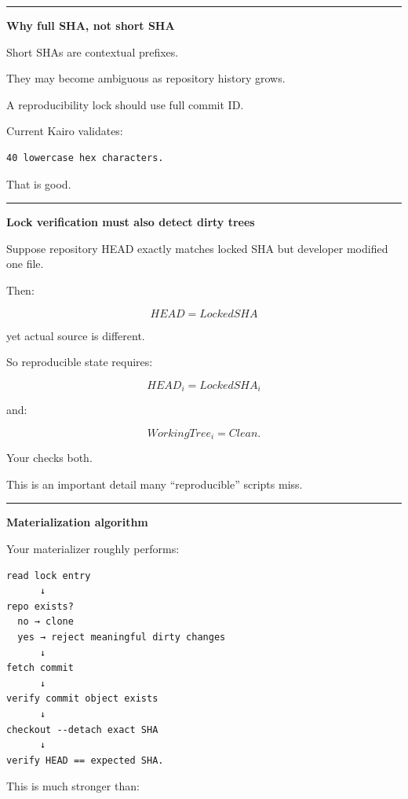 \begin{center}\rule{0.5\linewidth}{0.5pt}\end{center}

\textbf{Why full SHA, not short SHA}

Short SHAs are contextual prefixes.

They may become ambiguous as repository history grows.

A reproducibility lock should use full commit ID.

Current Kairo validates:

\begin{verbatim}
40 lowercase hex characters.
\end{verbatim}

That is good.

\begin{center}\rule{0.5\linewidth}{0.5pt}\end{center}

\textbf{Lock verification must also detect dirty trees}

Suppose repository HEAD exactly matches locked SHA but developer modified one file.

Then:

\[
HEAD=LockedSHA
\]

yet actual source is different.

So reproducible state requires:

\[
HEAD_i=LockedSHA_i
\]

and:

\[
WorkingTree_i=Clean.
\]

Your  checks both.

This is an important detail many ``reproducible'' scripts miss.

\begin{center}\rule{0.5\linewidth}{0.5pt}\end{center}

\textbf{Materialization algorithm}

Your materializer roughly performs:

\begin{verbatim}
read lock entry
      ↓
repo exists?
  no → clone
  yes → reject meaningful dirty changes
      ↓
fetch commit
      ↓
verify commit object exists
      ↓
checkout --detach exact SHA
      ↓
verify HEAD == expected SHA.
\end{verbatim}

This is much stronger than:

